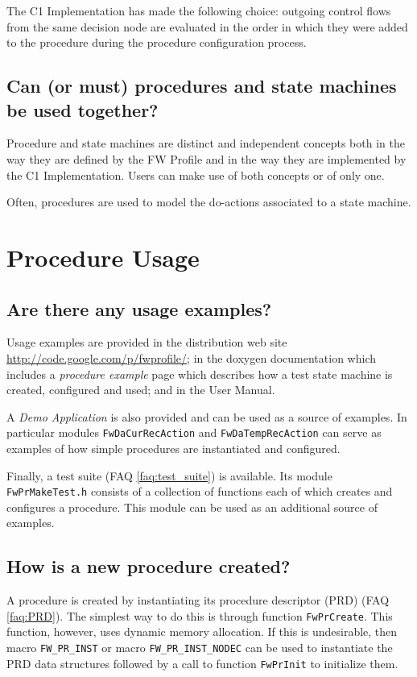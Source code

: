 \documentclass[faq]{../fwprofile}
\begin{document}
The C1 Implementation has made the following choice: outgoing control flows from the same decision node are evaluated in the order in which they were added 
to the procedure during the procedure configuration process.

\subsection{Can (or must) procedures and state machines be used together?}
Procedure and state machines are distinct and independent concepts both in the way they are defined by the FW Profile and in the way they are implemented 
by the C1 Implementation. Users can make use of both concepts or of only one. 

Often, procedures are used to model the do-actions associated to a state machine.

\section{Procedure Usage}

\subsection{Are there any usage examples?}
Usage examples are provided in the distribution web site 
\url{http://code.google.com/p/fwprofile/}; in 
the doxygen documentation which includes a \emph{procedure example} page which describes how a test state machine is created, configured and used; and in the User Manual.

A \emph{Demo Application} is also provided and can be used as a source of examples. In particular modules \texttt{FwDaCurRecAction} and \texttt{FwDaTempRecAction} can serve as examples of how simple procedures are instantiated and configured.

Finally, a test suite (FAQ \ref{faq:test_suite}) is available. Its module \texttt{FwPrMakeTest.h} consists of a collection of functions each 
of which creates and configures a procedure. This module can be used as an additional source of examples.

\subsection{How is a new procedure created?}
A procedure is created by instantiating its procedure descriptor (PRD) (FAQ \ref{faq:PRD}). The simplest way to do this is through function \texttt{FwPrCreate}. 
This function, however, uses dynamic memory allocation. If this is undesirable, then macro \texttt{FW\_PR\_INST} 
or macro \texttt{FW\_PR\_INST\_NODEC} can be used to instantiate 
the PRD data structures followed by a call to function \texttt{FwPrInit} to initialize them.
\end{document}
